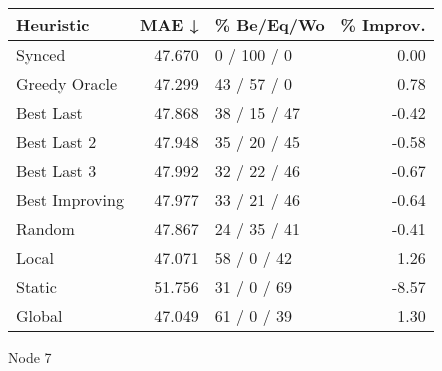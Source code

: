 \begin{tabular}{lrlr}
\toprule
\textbf{Heuristic} & \textbf{MAE ↓} & \textbf{\% Be/Eq/Wo} & \textbf{\% Improv.} \\
\midrule
            Synced &         47.670 &          0 / 100 / 0 &                0.00 \\
     Greedy Oracle &         47.299 &          43 / 57 / 0 &                0.78 \\
         Best Last &         47.868 &         38 / 15 / 47 &               -0.42 \\
       Best Last 2 &         47.948 &         35 / 20 / 45 &               -0.58 \\
       Best Last 3 &         47.992 &         32 / 22 / 46 &               -0.67 \\
    Best Improving &         47.977 &         33 / 21 / 46 &               -0.64 \\
            Random &         47.867 &         24 / 35 / 41 &               -0.41 \\
             Local &         47.071 &          58 / 0 / 42 &                1.26 \\
            Static &         51.756 &          31 / 0 / 69 &               -8.57 \\
            Global &         47.049 &          61 / 0 / 39 &                1.30 \\
\bottomrule
\end{tabular}
\caption{Node 7}
\label{tab:iid_lr05_le1_bs4_7}
